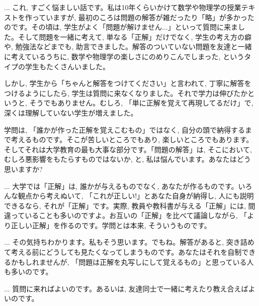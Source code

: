
\hv

\begin{faq}{\small{} ... 
これ, すごく悩ましい話です。私は10年くらいかけて数学や物理学の授業テキストを作っていますが, 最初のころは問題の解答が雑だったり「略」が多かったのです。その頃は, 学生がよく「問題が解けません...」といって質問に来ました。そして問題を一緒に考えて, 単なる「正解」だけでなく, 学生の考え方の癖や, 勉強法などまでも, 助言できました。解答のついていない問題を友達と一緒に考えているうちに, 数学や物理学の楽しさにのめりこんでしまった, というタイプの学生もたくさんいました。

しかし, 学生から「ちゃんと解答をつけてください」と言われて, 丁寧に解答をつけるようにしたら, 学生は質問に来なくなりました。それで学力は伸びたかというと, そうでもありません。むしろ, 「単に正解を覚えて再現してるだけ」で, 深くは理解していない学生が増えました。

学問は, 「誰かが作った正解を覚えこむもの」ではなく, 自分の頭で納得するまで考えるものです。そこが苦しいところでもあり, 楽しいところでもあります。そしてそれは大学教育の最も大事な部分です。「問題の解答」は, そこにおいて, むしろ悪影響をもたらすものではないか, と, 私は悩んでいます。あなたはどう思いますか?}\end{faq}

\begin{faq}{\small{} ... 
大学では「正解」は, 誰かが与えるものでなく, あなたが作るものです。いろんな観点から考えぬいて, 「これが正しい!」とあなた自身が納得し, 人にも説明できるなら, それが「正解」です。実際, 教員や教科書が与える「正解」には, 間違っていることも多いのですよ。お互いの「正解」を比べて議論しながら, 「より正しい正解」を作るのです。学問とは本来, そういうものです。}\end{faq}

\begin{faq}{\small{} ... 
その気持ちわかります。私もそう思います。でもね。解答があると, 突き詰めて考える前にどうしても見たくなってしまうものです。あなたはそれを自制できるかもしれませんが, 「問題は正解を丸写しにして覚えるもの」と思っている人も多いのです。}\end{faq}

\begin{faq}{\small{} ... 
質問に来ればよいのです。あるいは, 友達同士で一緒に考えたり教え合えばよいのです。}\end{faq}

